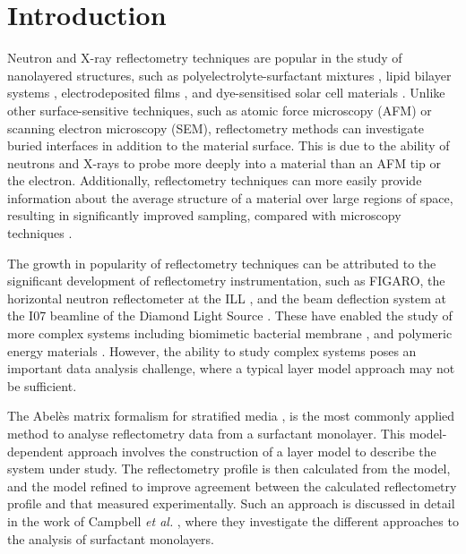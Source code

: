 \documentclass[amsmath,amssymb,twocolumn,superscriptaddress]{revtex4-1}
\begin{document}
\maketitle                        %

\section{Introduction}

Neutron and X-ray reflectometry techniques are popular in the study of
nanolayered structures, such as polyelectrolyte-surfactant
mixtures \cite{Llamas2018}, lipid bilayer systems \cite{Waldie2018},
electrodeposited films \cite{Beebee2019}, and dye-sensitised solar cell
materials \cite{McCreeGrey2015}.
Unlike other surface-sensitive techniques, such as atomic force microscopy
(AFM) or scanning electron microscopy (SEM), reflectometry methods can
investigate buried interfaces in addition to the material surface.
This is due to the ability of neutrons and X-rays to probe more deeply into
a material than an AFM tip or the electron.
Additionally, reflectometry techniques can more easily provide information
about the average structure of a material over large regions of space,
resulting in significantly improved sampling, compared with microscopy
techniques \cite{Renaud2009}.

The growth in popularity of reflectometry techniques can be attributed to
the significant development of reflectometry instrumentation, such as
FIGARO, the horizontal neutron reflectometer at the ILL \cite{Campbell2011},
and the beam deflection system at the I07 beamline of the Diamond Light
Source \cite{Arnold2012}.
These have enabled the study of more complex systems including biomimetic
bacterial membrane \cite{Barker2016}, and polymeric energy
materials \cite{Khodakarimi2016}.
However, the ability to study complex systems poses an important data
analysis challenge, where a typical layer model approach may not be
sufficient.

The Abel\`{e}s matrix formalism for stratified media \cite{Abeles1950}, is
the most commonly applied method to analyse reflectometry data from a
surfactant monolayer.
This model-dependent approach involves the construction of a layer model to
describe the system under study.
The reflectometry profile is then calculated from the model, and the model
refined to improve agreement between the calculated reflectometry profile
and that measured experimentally.
Such an approach is discussed in detail in the work of
Campbell \emph{et al.} \cite{Campbell2018}, where they investigate the
different approaches to the analysis of surfactant monolayers.
\end{document}

